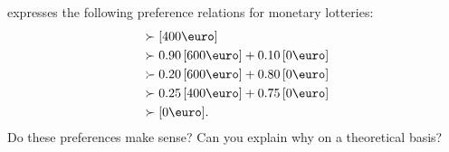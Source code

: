 \documentclass{../ape}
\begin{document}
\section{}
\TAtwo{} expresses the following preference relations for monetary lotteries:
\begin{align*}
	[600\text{\euro}] & \succ [400\text{\euro}] \\
							 			& \succ 0.90 \, [600\text{\euro}] + 0.10 \, [0\text{\euro}] \\
							 			& \succ 0.20 \, [600\text{\euro}] + 0.80 \, [0\text{\euro}] \\
							 			& \succ 0.25 \, [400\text{\euro}] + 0.75 \, [0\text{\euro}] \\
							 			& \succ [0\text{\euro}].
\end{align*}
Do these preferences make sense? Can you explain why on a theoretical basis?
\begin{solution}

\end{solution}
\end{document}
